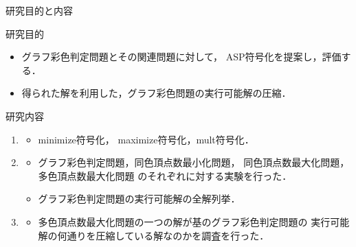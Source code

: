\documentclass[dvipdfmx,11pt]{beamer}
\begin{document}

\begin{frame}{研究目的と内容}

 \begin{alertblock}{研究目的}%
  \begin{itemize}
   \item グラフ彩色判定問題とその関連問題に対して，
         ASP符号化を提案し，評価する．
   \item 得られた解を利用した，グラフ彩色問題の実行可能解の圧縮．
  \end{itemize}

 \end{alertblock}

 \begin{block}{研究内容}
  \begin{enumerate}
   \item {}
         \begin{itemize}
          \item %
                minimize符号化，
                maximize符号化，mult符号化．
         \end{itemize}
   \item {}
         \begin{itemize}
          \item グラフ彩色判定問題，同色頂点数最小化問題，
                同色頂点数最大化問題，多色頂点数最大化問題
                のそれぞれに対する実験を行った．
          \item グラフ彩色判定問題の実行可能解の全解列挙．%
         \end{itemize}
   \item {}
         \begin{itemize}
          \item 多色頂点数最大化問題の一つの解が基のグラフ彩色判定問題の
                実行可能解の何通りを圧縮している解なのかを調査を行った．
         \end{itemize}
  \end{enumerate}
 \end{block}
 
\end{frame}
\end{document}

